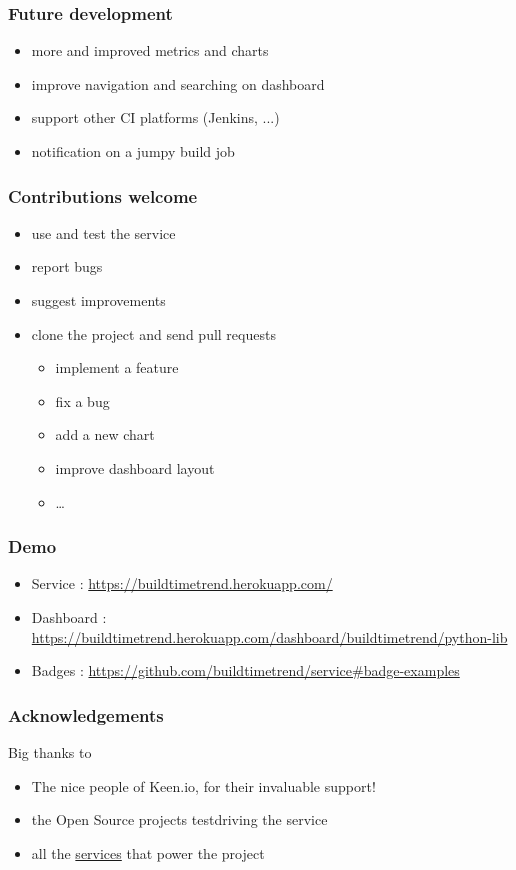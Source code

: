 \documentclass[14pt]{beamer}
\begin{document}
 \begin{frame}
    \frametitle{Future development}
    \begin{itemize}
      \item more and improved metrics and charts
      \item improve navigation and searching on dashboard
      \item support other CI platforms (Jenkins, ...)
      \item notification on a jumpy build job
    \end{itemize}
  \end{frame}
  \begin{frame}
    \frametitle{Contributions welcome}
    \begin{itemize}
      \item use and test the service
      \item report bugs
      \item suggest improvements
      \item clone the project and send pull requests
      \begin{itemize}
        \item implement a feature
        \item fix a bug
        \item add a new chart
        \item improve dashboard layout
        \item \ldots
      \end{itemize}
    \end{itemize}
  \end{frame}
  \begin{frame}
    \frametitle{Demo}
    \begin{itemize}
      \item Service : \href{https://buildtimetrend.herokuapp.com/}{\small{https://buildtimetrend.herokuapp.com/}}
      \item Dashboard : \href{https://buildtimetrend.herokuapp.com/dashboard/buildtimetrend/python-lib/index.html}{\small{https://buildtimetrend.herokuapp.com/dashboard/buildtimetrend/python-lib}}
      \item Badges : \href{https://github.com/buildtimetrend/service\#badge-examples}{\small{https://github.com/buildtimetrend/service\#badge-examples}}
    \end{itemize}
  \end{frame}
  \begin{frame}
    \frametitle{Acknowledgements}
    Big thanks to
    \begin{itemize}
      \item The nice people of Keen.io, for their invaluable support!
      \item the Open Source projects testdriving the service
      \item all the \href{https://github.com/buildtimetrend/python-lib/wiki/Credits}{services} that power the project
    \end{itemize}
  \end{frame}
\end{document}
